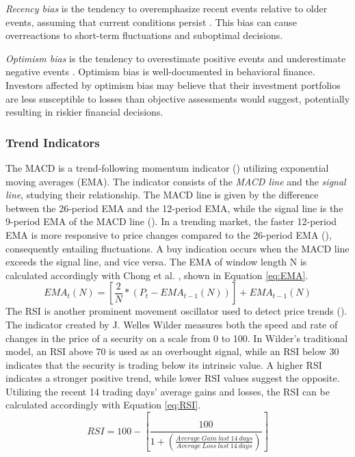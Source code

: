 \textit{Recency bias} is the tendency to overemphasize recent events relative to older events, assuming that current conditions persist \parencite{lee2008analysis, tversky1973availability}. This bias can cause overreactions to short-term fluctuations and suboptimal decisions. 

\textit{Optimism bias} is the tendency to overestimate positive events and underestimate negative events \parencite{scribbrWhatOptimism}. Optimism bias is well-documented in behavioral finance. Investors affected by optimism bias may believe that their investment portfolios are less susceptible to losses than objective assessments would suggest, potentially resulting in riskier financial decisions.

\subsubsection{Trend Indicators}

The MACD is a trend-following momentum indicator (\cite{investopediaMACDIndicator}) utilizing exponential moving averages (EMA). The indicator consists of the \textit{MACD line} and the \textit{signal line}, studying their relationship. The MACD line is given by the difference between the 26-period EMA and the 12-period EMA, while the signal line is the 9-period EMA of the MACD line (\cite{chong2014revisiting}). In a trending market, the faster 12-period EMA is more responsive to price changes compared to the 26-period EMA (\cite{forbesDemystifyingMACD}), consequently entailing fluctuations. A buy indication occurs when the MACD line exceeds the signal line, and vice versa. The EMA of window length N is calculated accordingly with Chong et al. \parencite*{chong2014revisiting}, shown in Equation \ref{eq:EMA}.
\begin{equation}\label{eq:EMA}
    {EMA}_t(N)=\left[\frac{2}{N}*(P_t-{EMA}_{t-1}(N))\right]+{EMA}_{t-1}(N)
\end{equation}
The RSI is another prominent movement oscillator used to detect price trends (\cite{forbesWhatRelative}). The indicator created by J. Welles Wilder measures both the speed and rate of changes in the price of a security on a scale from 0 to 100. In Wilder’s traditional model, an RSI above 70 is used as an overbought signal, while an RSI below 30 indicates that the security is trading below its intrinsic value. A higher RSI indicates a stronger positive trend, while lower RSI values suggest the opposite. Utilizing the recent 14 trading days' average gains and losses, the RSI can be calculated accordingly with Equation \ref{eq:RSI}. 
\begin{equation}\label{eq:RSI}
    RSI=100-\left[\frac{100}{1+\left(\frac{Average\:Gain\:last\:14\:days}{Average\:Loss\:last\:14\:days}\right)}\right]
\end{equation}

